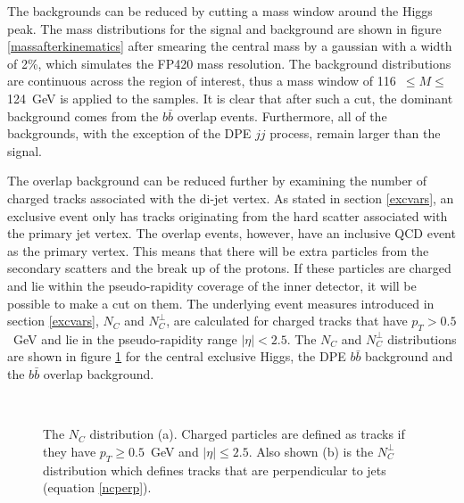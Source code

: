 The backgrounds can be reduced by cutting a mass window around the Higgs peak. The mass distributions for the signal and background are shown in figure \ref{massafterkinematics} after smearing the central mass by a gaussian with a width of 2\%, which simulates the FP420 mass resolution. The background distributions are continuous across the region of interest, thus a mass window of 116~$\leq M \leq$124~GeV is applied to the samples. It is clear that after such a cut, the dominant background comes from the $b\bar{b}$ overlap events. Furthermore, 
all of the backgrounds, with the exception of the DPE $jj$ process, remain larger than the signal.




The overlap background can be reduced further by examining the number of charged tracks associated with the  di-jet vertex. As stated in section \ref{excvars}, an exclusive event only has tracks originating from the hard scatter associated with the primary jet vertex. The overlap events, however, have an inclusive QCD event as the primary vertex. This means that there will be extra particles from the secondary scatters and the break up of the protons. If these particles are charged and lie within the pseudo-rapidity coverage of the inner detector, it will be possible to make a cut on them. The underlying event measures introduced in section \ref{excvars}, $N_C$ and $N_C^{\perp}$, are calculated for charged tracks that have $p_T>0.5$~GeV and lie in the pseudo-rapidity range $|\eta| < 2.5$. The $N_C$ and $N_C^{\perp}$ distributions are shown in figure \ref{nchargedtracks} for the central exclusive Higgs, the DPE $b\bar{b}$ background and the $b\bar{b}$ overlap background. 

\begin{figure}
\centering
\mbox{
	\quad
	}
\caption[The number of charged tracks associated with the primary vertex]{The $N_C$ distribution (a). Charged particles are defined as tracks if they have $p_T\geq0.5$~GeV and $|\eta|\leq2.5$. Also shown (b) is the $N_C^{\perp}$ distribution which defines tracks that are perpendicular to jets (equation \ref{ncperp}).\label{nchargedtracks}}
\end{figure}

